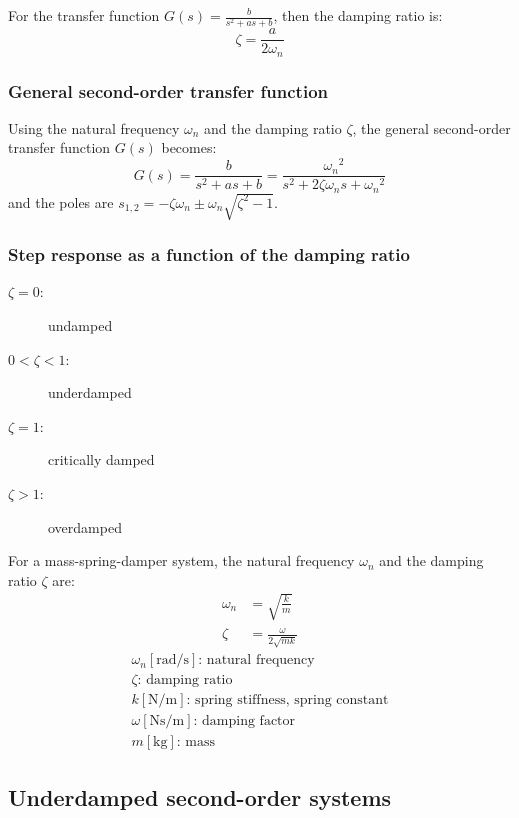 \documentclass[10pt, twocolumn]{article}
\begin{document}
For the transfer function \(G(s) = \frac{b}{s^2 + as + b}\), then the damping ratio is:
\[
  \zeta = \frac{a}{2\omega_n}
\]


\subsubsection{General second-order transfer function}
Using the natural frequency \(\omega_n\) and the damping ratio \(\zeta\), the general second-order transfer function \(G(s)\) becomes:
\[
  G(s) = \frac{b}{s^2 + as + b} = \frac{{\omega_n}^2}{s^2 + 2\zeta\omega_n s + {\omega_n}^2}
\]
and the poles are \(s_{1,2} = -\zeta\omega_n \pm \omega_n \sqrt{\zeta^2 - 1}\).


\subsubsection{Step response as a function of the damping ratio}
\begin{description}
  \item[\(\zeta = 0\):] undamped
  \item[\(0 < \zeta < 1\):] underdamped
  \item[\(\zeta = 1\):] critically damped
  \item[\(\zeta > 1\):] overdamped
\end{description}

\begin{example}
  For a mass-spring-damper system, the natural frequency \(\omega_n\) and the damping ratio \(\zeta\) are:
  \begin{align*}
    \omega_n & = \sqrt{\frac{k}{m}}         \\
    \zeta    & = \frac{\omega}{2 \sqrt{mk}}
  \end{align*}
  \[
    \begin{array}{|l}
      \omega_n [\si{\radian\per\second}] \text{: natural frequency}         \\
      \zeta \text{: damping ratio}                                          \\
      k [\si{\newton\per\metre}] \text{: spring stiffness, spring constant} \\
      \omega [\si{\newton\second\per\metre}] \text{: damping factor}        \\
      m [\si{\kilogram}] \text{: mass}
    \end{array}
  \]
\end{example}


\subsection{Underdamped second-order systems}
\end{document}
